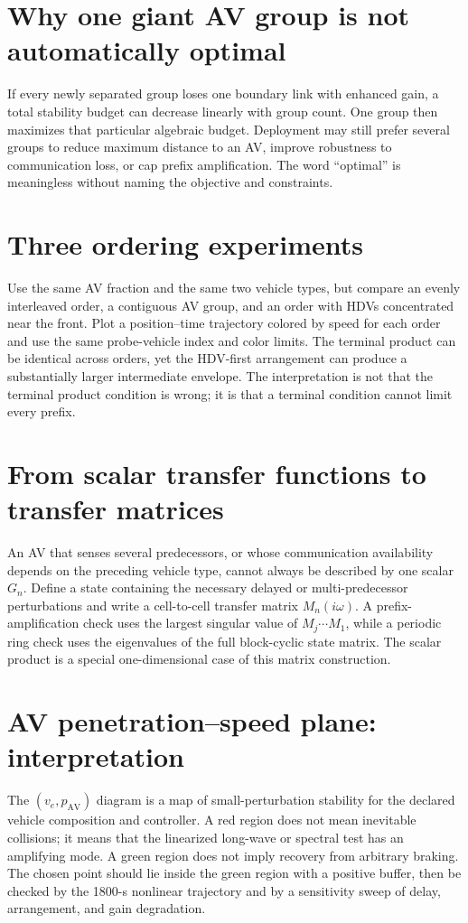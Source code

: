 \documentclass[11pt,a4paper,openany]{book}
\numberwithin{equation}{chapter}
\numberwithin{figure}{chapter}
\numberwithin{table}{chapter}
\begin{document}
\section{Why one giant AV group is not automatically optimal}
If every newly separated group loses one boundary link with enhanced gain, a total stability budget can decrease linearly with group count. One group then maximizes that particular algebraic budget. Deployment may still prefer several groups to reduce maximum distance to an AV, improve robustness to communication loss, or cap prefix amplification. The word ``optimal'' is meaningless without naming the objective and constraints.

\section{Three ordering experiments}
Use the same AV fraction and the same two vehicle types, but compare an evenly interleaved order, a contiguous AV group, and an order with HDVs concentrated near the front. Plot a position--time trajectory colored by speed for each order and use the same probe-vehicle index and color limits. The terminal product can be identical across orders, yet the HDV-first arrangement can produce a substantially larger intermediate envelope. The interpretation is not that the terminal product condition is wrong; it is that a terminal condition cannot limit every prefix.

\section{From scalar transfer functions to transfer matrices}
An AV that senses several predecessors, or whose communication availability depends on the preceding vehicle type, cannot always be described by one scalar $G_n$. Define a state containing the necessary delayed or multi-predecessor perturbations and write a cell-to-cell transfer matrix $M_n(i\omega)$. A prefix-amplification check uses the largest singular value of $M_j\cdots M_1$, while a periodic ring check uses the eigenvalues of the full block-cyclic state matrix. The scalar product is a special one-dimensional case of this matrix construction.

\section{AV penetration--speed plane: interpretation}
The $(v_e,p_{\mathrm{AV}})$ diagram is a map of small-perturbation stability for the declared vehicle composition and controller. A red region does not mean inevitable collisions; it means that the linearized long-wave or spectral test has an amplifying mode. A green region does not imply recovery from arbitrary braking. The chosen point should lie inside the green region with a positive buffer, then be checked by the 1800-s nonlinear trajectory and by a sensitivity sweep of delay, arrangement, and gain degradation.
\end{document}
